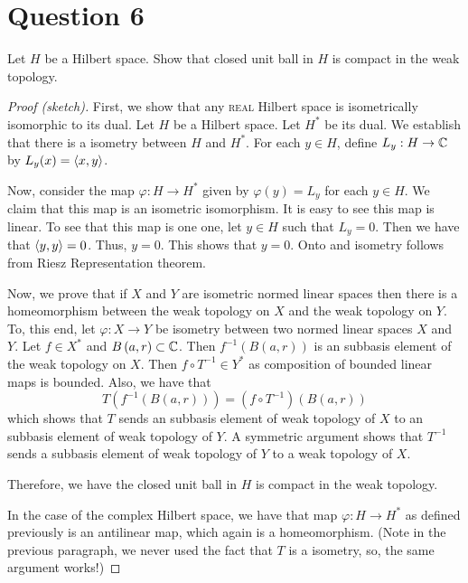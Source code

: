 \section{Question 6}
\horz

Let $H$ be a Hilbert space. Show that closed unit ball in $H$ is compact in the weak topology.

\horz

\begin{proof}[Proof (sketch)]
    First, we show that any \textsc{real} Hilbert space is isometrically isomorphic to its dual. Let $H$ be a Hilbert space. Let $H^{*}$ be its dual. We establish that there is a isometry between $H$ and $H^{*}$. For each $y\in H$, define $L_{y} : H \to \mathbb C$ by $L_{y} (x) = \left\langle x,y \right\rangle$.

    Now, consider the map $\varphi : H \to H^{*}$ given by $\varphi \left( y \right) = L_{y}$ for each $y\in H$. We claim that this map is an isometric isomorphism. It is easy to see this map is linear. To see that this map is one one, let $y \in H$ such that $L_{y} = 0$. Then we have that $\left\langle y,y \right\rangle =0$. Thus, $y=0$. This shows that $y =0$. Onto and isometry follows from Riesz Representation theorem.

    Now, we prove that if $X$ and $Y$ are isometric normed linear spaces then there is a homeomorphism between the weak topology on $X$ and the weak topology on $Y$. To, this end, let $\varphi : X \to Y$ be isometry between two normed linear spaces $X$ and $Y$. Let $f \in X^{*}$ and $B\left( a,r \right) \subset \mathbb C$. Then $f^{-1} \left( B\left( a,r \right) \right)$ is an subbasis element of the weak topology on $X$. Then $f \circ T^{-1} \in Y^{*}$ as composition of bounded linear maps is bounded. Also, we have that 
    \begin{equation*}
	T\left( f^{-1} \left( B\left( a,r \right) \right) \right) = \left( f\circ T^{-1} \right) \left( B\left( a,r \right) \right)
    \end{equation*}
    which shows that $T$ sends an subbasis element of weak topology of $X$ to an subbasis element of weak topology of $Y$. A symmetric argument shows that $T^{-1}$ sends a subbasis element of weak topology of $Y$ to a weak topology of $X$.

    Therefore, we have the closed unit ball in $H$ is compact in the weak topology.

    In the case of the complex Hilbert space, we have that map $\varphi : H \to H^{*}$ as defined previously is an antilinear map, which again is a homeomorphism. (Note in the previous paragraph, we never used the fact that $T$ is a isometry, so, the same argument works!)
\end{proof}
